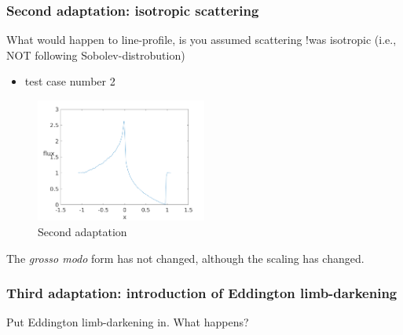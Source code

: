 \documentclass[../main/main.tex]{subfiles}
\begin{document}
\newpage
\subsubsection{Second adaptation: isotropic scattering}
\label{isotropic_scattering}
What would happen to line-profile, is you assumed scattering
!was isotropic (i.e., NOT following Sobolev-distrobution)
\begin{itemize}
\item test case number 2
\end{itemize}

\begin{figure}[!htp]
\centering
\includegraphics[width=0.5\textwidth]{../../introductory_exercises/P_Cygni_profile_UV_resonance/npot6xk0100alpha0beta1test2.png}
\caption{Second adaptation}
\end{figure}

The \textit{grosso modo} form has not changed, although the scaling has changed.

\newpage
\subsubsection{Third adaptation: introduction of Eddington limb-darkening}
\label{Eddington limb darkening adaptation}
Put Eddington limb-darkening in. What happens? 
\end{document}
